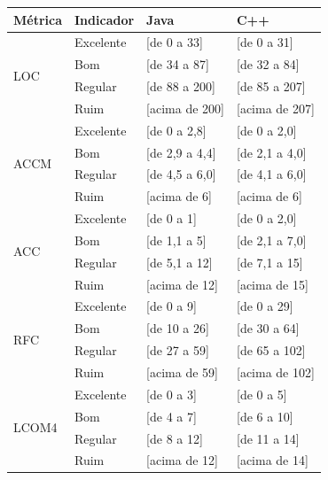 	\begin{table}[!ht]
	\begin{center}
	\begin{tabular}{ |l|l|l|l| }
		\hline
		Métrica & Indicador & Java & C++ \\ \hline
		\multirow{4}{*}{LOC} 
		 & Excelente & [de 0 a 33] & [de 0 a 31] \\
		 & Bom & [de 34 a 87] & [de 32 a 84] \\
		 & Regular & [de 88 a 200] & [de 85 a 207] \\
		 & Ruim & [acima de 200] & [acima de 207] \\ \hline
		 
		\multirow{4}{*}{ACCM} 
		 & Excelente & [de 0 a 2,8] & [de 0 a 2,0] \\
		 & Bom & [de 2,9 a 4,4] & [de 2,1 a 4,0] \\
		 & Regular & [de 4,5 a 6,0] & [de 4,1 a 6,0] \\
		 & Ruim & [acima de 6] & [acima de 6] \\ \hline
		 
		 
		\multirow{4}{*}{ACC} 
		 & Excelente & [de 0 a 1] & [de 0 a 2,0] \\
		 & Bom & [de 1,1 a 5] & [de 2,1 a 7,0] \\
		 & Regular & [de 5,1 a 12] & [de 7,1 a 15] \\
		 & Ruim & [acima de 12] & [acima de 15] \\ \hline
	
		 
		\multirow{4}{*}{RFC} 
		 & Excelente & [de 0 a 9] & [de 0 a 29] \\
		 & Bom & [de 10 a 26] & [de 30 a 64] \\
		 & Regular & [de 27 a 59] & [de 65 a 102] \\
		 & Ruim & [acima de 59] & [acima de 102] \\ \hline
		 
		\multirow{4}{*}{LCOM4} 
		 & Excelente & [de 0 a 3] & [de 0 a 5] \\
		 & Bom & [de 4 a 7] & [de 6 a 10] \\
		 & Regular & [de 8 a 12] & [de 11 a 14] \\
		 & Ruim & [acima de 12] & [acima de 14] \\ \hline
		 

\end{tabular}
\end{center}
\end{table}
